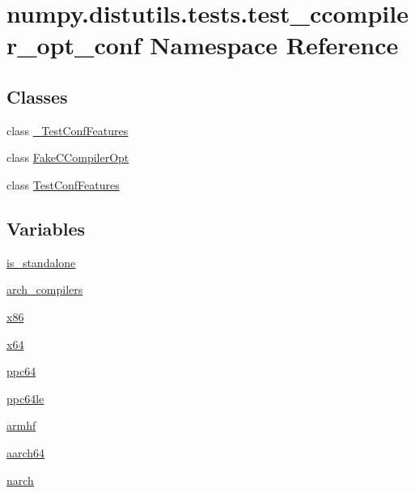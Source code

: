 \hypertarget{namespacenumpy_1_1distutils_1_1tests_1_1test__ccompiler__opt__conf}{}\section{numpy.\+distutils.\+tests.\+test\+\_\+ccompiler\+\_\+opt\+\_\+conf Namespace Reference}
\label{namespacenumpy_1_1distutils_1_1tests_1_1test__ccompiler__opt__conf}
\subsection*{Classes}
\begin{DoxyCompactItemize}
\item 
class \hyperlink{classnumpy_1_1distutils_1_1tests_1_1test__ccompiler__opt__conf_1_1__TestConfFeatures}{\+\_\+\+Test\+Conf\+Features}
\item 
class \hyperlink{classnumpy_1_1distutils_1_1tests_1_1test__ccompiler__opt__conf_1_1FakeCCompilerOpt}{Fake\+C\+Compiler\+Opt}
\item 
class \hyperlink{classnumpy_1_1distutils_1_1tests_1_1test__ccompiler__opt__conf_1_1TestConfFeatures}{Test\+Conf\+Features}
\end{DoxyCompactItemize}
\subsection*{Variables}
\begin{DoxyCompactItemize}
\item 
\hyperlink{namespacenumpy_1_1distutils_1_1tests_1_1test__ccompiler__opt__conf_a461cc9a6d719c5656cc7ff0e573b2d10}{is\+\_\+standalone}
\item 
\hyperlink{namespacenumpy_1_1distutils_1_1tests_1_1test__ccompiler__opt__conf_a7c200cb0e493afe4804a3b83a0512aea}{arch\+\_\+compilers}
\item 
\hyperlink{namespacenumpy_1_1distutils_1_1tests_1_1test__ccompiler__opt__conf_a674f4c0b90bcaf70522eb8f59a4a4d00}{x86}
\item 
\hyperlink{namespacenumpy_1_1distutils_1_1tests_1_1test__ccompiler__opt__conf_a80c9d67bc292d00fc27a6272b98c45e3}{x64}
\item 
\hyperlink{namespacenumpy_1_1distutils_1_1tests_1_1test__ccompiler__opt__conf_a218f2c75080c625700cdfc102af04041}{ppc64}
\item 
\hyperlink{namespacenumpy_1_1distutils_1_1tests_1_1test__ccompiler__opt__conf_acb7ecab247fd668d0ea55bee21581f64}{ppc64le}
\item 
\hyperlink{namespacenumpy_1_1distutils_1_1tests_1_1test__ccompiler__opt__conf_aa527c5ec928309b6d4eab34b62f43c43}{armhf}
\item 
\hyperlink{namespacenumpy_1_1distutils_1_1tests_1_1test__ccompiler__opt__conf_a2dc4a84b6c6270e6815a94bbd037d3fa}{aarch64}
\item 
\hyperlink{namespacenumpy_1_1distutils_1_1tests_1_1test__ccompiler__opt__conf_a96aefe1870357fc605d51a5a1fc3a0bd}{narch}
\end{DoxyCompactItemize}


